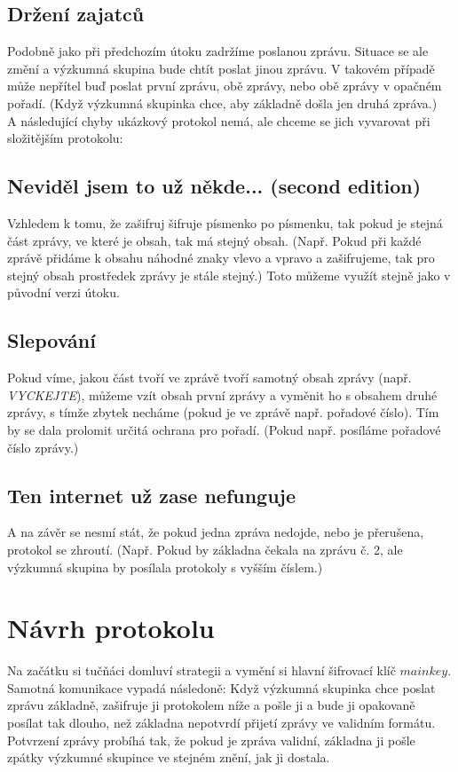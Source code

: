 \documentclass{article}
\begin{document}
\subsection{Držení zajatců}
\label{1.6}
Podobně jako při předchozím útoku zadržíme poslanou zprávu. Situace se ale změní a výzkumná skupina bude chtít poslat jinou zprávu. V takovém případě může nepřítel
buď poslat první zprávu, obě zprávy, nebo obě zprávy v opačném pořadí. (Když výzkumná skupinka chce, aby základně došla jen druhá zpráva.) \\

A následující chyby ukázkový protokol nemá, ale chceme se jich vyvarovat při složitějším protokolu:
\subsection{Neviděl jsem to už někde... (second edition)}
\label{1.7}
Vzhledem k tomu, že zašifruj šifruje písmenko po písmenku, tak pokud je stejná část zprávy, ve které je obsah, tak má stejný obsah. (Např. Pokud při každé zprávě
přidáme k obsahu náhodné znaky vlevo a vpravo a zašifrujeme, tak pro stejný obsah prostředek zprávy je stále stejný.) Toto můžeme využít stejně jako v původní verzi útoku.
\subsection{Slepování}
\label{1.8}
Pokud víme, jakou část tvoří ve zprávě tvoří samotný obsah zprávy (např. \emph{VYCKEJTE}), můžeme vzít obsah první zprávy a vyměnit ho s obsahem druhé zprávy, s tímže zbytek
necháme (pokud je ve zprávě např. pořadové číslo). Tím by se dala prolomit určitá ochrana pro pořadí. (Pokud např. posíláme pořadové číslo zprávy.)
\subsection{Ten internet už zase nefunguje}
\label{1.9}
A na závěr se nesmí stát, že pokud jedna zpráva nedojde, nebo je přerušena, protokol se zhroutí. (Např. Pokud by základna čekala na zprávu č. 2, ale
výzkumná skupina by posílala protokoly s vyšším číslem.)

\section{Návrh protokolu}
Na začátku si tučňáci domluví strategii a vymění si hlavní šifrovací klíč \(mainkey\).
Samotná komunikace vypadá následoně: Když výzkumná skupinka chce poslat zprávu základně, zašifruje ji protokolem níže a pošle ji a bude ji opakovaně posílat tak
dlouho, než základna nepotvrdí přijetí zprávy ve validním formátu. Potvrzení zprávy probíhá tak, že pokud je zpráva validní, základna ji pošle
zpátky výzkumné skupince ve stejném znění, jak ji dostala.
\end{document}
